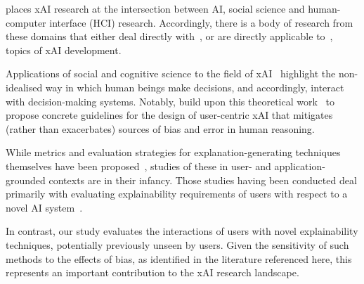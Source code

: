 \citet{miller2019explanation} places xAI research at the intersection between AI, social science and human-computer interface (HCI) research. Accordingly, there is a body of research from these domains that either deal directly with~\cite{abdul2020cogam, holzinger2013human}, or are directly applicable to~\cite{nielsen2005ten}, topics of xAI development.

Applications of social and cognitive science to the field of xAI~\cite{de2017people, miller2019explanation, lipton2018mythos, jussupow2021augmenting} highlight the non-idealised way in which human beings make decisions, and accordingly, interact with decision-making systems. Notably, \citet{wang_designing_2019} build upon this theoretical work~\cite{hoffman2017explainingpart1,hoffman2017explainingpart2, klein2018explainingpart3, hoffman2018explainingpart4} to propose concrete guidelines for the design of user-centric xAI that mitigates (rather than exacerbates) sources of bias and error in human reasoning.

While metrics and evaluation strategies for explanation-generating techniques themselves have been proposed~\cite{doshi2017towards, HolzingerEtAl:2019:Wiley-Paper, HolzingerEtAl:2020:QualityOfExplanations}, studies of these in user- and application-grounded contexts are in their infancy. Those studies having been conducted deal primarily with evaluating explainability requirements of users with respect to a novel AI system~\cite{liao2020questioning, cai2019hello}. 

In contrast, our study evaluates the interactions of users with novel explainability techniques, potentially previously unseen by users. Given the sensitivity of such methods to the effects of bias, as identified in the literature referenced here, this represents an important contribution to the xAI research landscape.


